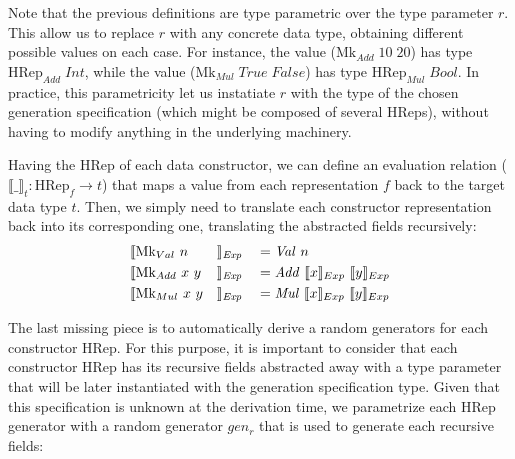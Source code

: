 \documentclass[conference, fleqn]{IEEEtran}
\newcommand{\Conid}[1]{\mathit{#1}}
\newcommand{\Varid}[1]{\mathit{#1}}
\newcommand{\evalrep}[2]{\ensuremath{\llbracket #1 \rrbracket_{#2}}}
\begin{document}
Note that the previous definitions are type parametric over the type parameter
\ensuremath{\Varid{r}}.
%
This allow us to replace \ensuremath{\Varid{r}} with any concrete data type, obtaining different
possible values on each case.
%
For instance, the value (\ensuremath{\text{Mk}_{Add}\;\mathrm{10}\;\mathrm{20}}) has type \ensuremath{\text{HRep}_{Add}\;\Conid{Int}}, while the
value (\ensuremath{\text{Mk}_{Mul}\;\Conid{True}\;\Conid{False}}) has type \ensuremath{\text{HRep}_{Mul}\;\Conid{Bool}}.
%
In practice, this parametricity let us instatiate \ensuremath{\Varid{r}} with the type of the
chosen generation specification (which might be composed of several \ensuremath{\text{HRep}}s),
without having to modify anything in the underlying machinery.


Having the \ensuremath{\text{HRep}} of each data constructor, we can define an evaluation relation
($\evalrep{\_}{t} : \ensuremath{\text{HRep}}_f \rightarrow t$) that maps a value from each
representation \ensuremath{\Varid{f}} back to the target data type \ensuremath{\Varid{t}}.
%
Then, we simply need to translate each constructor representation back into its
corresponding one, translating the abstracted fields recursively:
%
\begin{alignat*}{4}
  &\evalrep{\ensuremath{\text{Mk}_{Val}}\ n\ \ \ &&}{\ensuremath{\Conid{Exp}}}
    &&= \ensuremath{\Conid{Val}}\ n \\
  &\evalrep{\ensuremath{\text{Mk}_{Add}}\ x\ y   &&}{\ensuremath{\Conid{Exp}}}
    &&= \ensuremath{\Conid{Add}}\ \evalrep{x}{Exp}\ \evalrep{y}{Exp} \\
  &\evalrep{\ensuremath{\text{Mk}_{Mul}}\ x\ y   &&}{\ensuremath{\Conid{Exp}}}
    &&= \ensuremath{\Conid{Mul}}\ \evalrep{x}{Exp}\ \evalrep{y}{Exp}
\end{alignat*}

The last missing piece is to automatically derive a random generators for each
constructor \ensuremath{\text{HRep}}.
%
For this purpose, it is important to consider that each constructor \ensuremath{\text{HRep}} has
its recursive fields abstracted away with a type parameter that will be later
instantiated with the generation specification type.
%
Given that this specification is unknown at the derivation time, we parametrize
each \ensuremath{\text{HRep}} generator with a random generator \ensuremath{gen_{r}} that is used to generate
each recursive fields:
\end{document}

